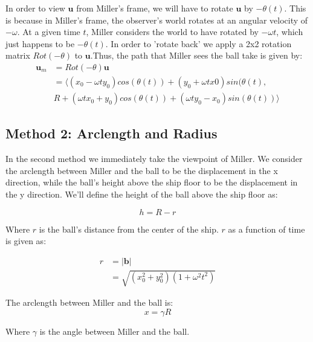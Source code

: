 \documentclass{amsart}
\renewcommand{\vec}{\textbf}
\theoremstyle{definition}
\begin{document}
In order to view $\vec{u}$ from Miller's frame, we will have to rotate $\vec{u}$ by $-\theta(t)$. This is because in Miller's frame, the observer's world rotates at an angular velocity of $-\omega$. At a given time $t$, Miller considers the world to have rotated by $- \omega t$, which just happens to be $-\theta (t)$. In order to 'rotate back' we apply a 2x2 rotation matrix $Rot(-\theta)$ to $\vec{u}$.Thus, the path that Miller sees the ball take is given by:
\begin{equation}
\begin{split}
        \vec{u}_m & = Rot(-\theta)\vec{u} \\
        &= \langle (x_0 - \omega t y_0) cos(\theta(t)) + (y_0 + \omega t x0 )sin(\theta (t), \\
        &R+(\omega t x_0 + y_0)cos(\theta(t))+(\omega t y_0 - x_0)sin(\theta (t)) \rangle    
\end{split}
\end{equation}

\subsection*{Method 2: Arclength and Radius}
In the second method we immediately take the viewpoint of Miller. We consider the arclength between Miller and the ball to be the displacement in the x direction, while the ball's height above the ship floor to be the displacement in the y direction. We'll define the height of the ball above the ship floor as:

\[h = R - r\]

Where $r$ is the ball's distance from the center of the ship. $r$ as a function of time is given as:

\begin{equation}
\begin{split}
    r &= \lvert \vec{b} \rvert \\
    &= \sqrt{(x_0^2+y_0^2)(1+\omega^2 t^2)}
\end{split}
\end{equation}


The arclength between Miller and the ball is:
\begin{equation}
 x = \gamma R
\end{equation}

Where $\gamma$ is the angle between Miller and the ball.
\end{document}
